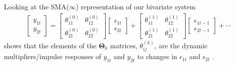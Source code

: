 \documentclass[a4paper,11pt,listof=nochaptergap,oneside,pointednumbers,bibtotoc,bigheadings,liststotoc,hidelinks]{scrbook}
\theoremstyle{mysatz}
\theoremstyle{mydefinition}
\theoremstyle{mytheorem}
\theoremstyle{mybemerkung}
\newcommand{\vect}[1]{\boldsymbol{\mathbf{#1}}}
\begin{document}
Looking at the SMA($\infty$) representation of our bivariate system 
\begin{equation} \label{eq:svar9}
\begin{split}
	\begin{bmatrix}
    	y_{1t} \\
    	y_{2t}
 	\end{bmatrix} 
	=
	\begin{bmatrix}
    	\theta_{11}^{(0)} & \theta_{12}^{(0)}\\
    	\theta_{21}^{(0)} & \theta_{22}^{(0)}
 	\end{bmatrix} 
	\begin{bmatrix}
    	\epsilon_{1t} \\
	\epsilon_{2t}
 	\end{bmatrix} + 
	\begin{bmatrix}
    	\theta_{11}^{(1)} & \theta_{12}^{(1)}\\
    	\theta_{21}^{(1)} & \theta_{22}^{(1)}
 	\end{bmatrix} 
	\begin{bmatrix}
    	\epsilon_{1t-1} \\
	\epsilon_{2t-1}
 	\end{bmatrix} + \cdots 
\end{split}								
\end{equation}
shows that the elements of the $\vect{\Theta}_k$ matrices, $\theta_{ij}^{(k)}$, are the dynamic multipliers/impulse responses of $y_{1t}$ and $y_{2t}$ to changes in $\epsilon_{1t}$ and $\epsilon_{2t}$ \citep{zivot:00}.\\
\end{document}
